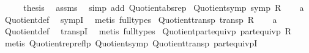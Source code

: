 \begin{isabellebody}
\ \ \isamarkupfalse%
\ \isamarkupfalse%
\ {\isacharquery}{\kern0pt}thesis\ \isamarkupfalse%
\ assms{\isacharparenleft}{\kern0pt}{}{\isacharparenright}{\kern0pt}\ \isamarkupfalse%
\ {\isacharparenleft}{\kern0pt}simp\ add{\isacharcolon}{\kern0pt}\ Quotient{\isacharunderscore}{\kern0pt}abs{\isacharunderscore}{\kern0pt}rep{\isacharparenright}{\kern0pt}\isanewline
{}\isamarkupfalse%
%
\endisatagproof
{\isafoldproof}%
%
\isadelimproof
\isanewline
%
\endisadelimproof
\isanewline
{}\isamarkupfalse%
\ Quotient{\isacharunderscore}{\kern0pt}symp{\isacharcolon}{\kern0pt}\ {\isachardoublequoteopen}symp\ R{\isachardoublequoteclose}\isanewline
%
\isadelimproof
\ \ %
\endisadelimproof
%
\isatagproof
{}\isamarkupfalse%
\ a\ \isamarkupfalse%
\ Quotient{\isacharunderscore}{\kern0pt}def\ \isamarkupfalse%
\ sympI\ \isamarkupfalse%
\ {\isacharparenleft}{\kern0pt}metis\ {\isacharparenleft}{\kern0pt}full{\isacharunderscore}{\kern0pt}types{\isacharparenright}{\kern0pt}{\isacharparenright}{\kern0pt}%
\endisatagproof
{\isafoldproof}%
%
\isadelimproof
\isanewline
%
\endisadelimproof
\isanewline
{}\isamarkupfalse%
\ Quotient{\isacharunderscore}{\kern0pt}transp{\isacharcolon}{\kern0pt}\ {\isachardoublequoteopen}transp\ R{\isachardoublequoteclose}\isanewline
%
\isadelimproof
\ \ %
\endisadelimproof
%
\isatagproof
{}\isamarkupfalse%
\ a\ \isamarkupfalse%
\ Quotient{\isacharunderscore}{\kern0pt}def\ \isamarkupfalse%
\ transpI\ \isamarkupfalse%
\ {\isacharparenleft}{\kern0pt}metis\ {\isacharparenleft}{\kern0pt}full{\isacharunderscore}{\kern0pt}types{\isacharparenright}{\kern0pt}{\isacharparenright}{\kern0pt}%
\endisatagproof
{\isafoldproof}%
%
\isadelimproof
\isanewline
%
\endisadelimproof
\isanewline
{}\isamarkupfalse%
\ Quotient{\isacharunderscore}{\kern0pt}part{\isacharunderscore}{\kern0pt}equivp{\isacharcolon}{\kern0pt}\ {\isachardoublequoteopen}part{\isacharunderscore}{\kern0pt}equivp\ R{\isachardoublequoteclose}\isanewline
%
\isadelimproof
%
\endisadelimproof
%
\isatagproof
{}\isamarkupfalse%
\ {\isacharparenleft}{\kern0pt}metis\ Quotient{\isacharunderscore}{\kern0pt}rep{\isacharunderscore}{\kern0pt}reflp\ Quotient{\isacharunderscore}{\kern0pt}symp\ Quotient{\isacharunderscore}{\kern0pt}transp\ part{\isacharunderscore}{\kern0pt}equivpI{\isacharparenright}{\kern0pt}%
\endisatagproof
{\isafoldproof}%

\end{isabellebody}
